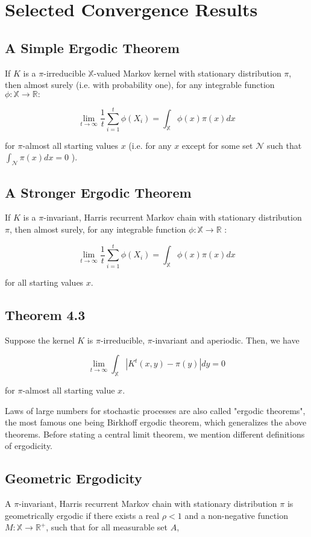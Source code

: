 \documentclass[10pt]{article}
\begin{document}
\section{Selected Convergence Results}
\subsection{A Simple Ergodic Theorem}
If $K$ is a $\pi$-irreducible $\mathbb{X}$-valued Markov kernel with stationary distribution $\pi$, then almost surely (i.e. with probability one), for any integrable function $\phi: \mathbb{X} \rightarrow \mathbb{R}:$

$$
\lim _{t \rightarrow \infty} \frac{1}{t} \sum_{i=1}^{t} \phi\left(X_{i}\right)=\int_{\mathbb{X}} \phi(x) \pi(x) d x
$$

for $\pi$-almost all starting values $x$ (i.e. for any $x$ except for some set $\mathcal{N}$ such that $\int_{\mathcal{N}} \pi(x) d x=0$ ).

\subsection{A Stronger Ergodic Theorem}
If $K$ is a $\pi$-invariant, Harris recurrent Markov chain with stationary distribution $\pi$, then almost surely, for any integrable function $\phi: \mathbb{X} \rightarrow \mathbb{R}$ :

$$
\lim _{t \rightarrow \infty} \frac{1}{t} \sum_{i=1}^{t} \phi\left(X_{i}\right)=\int_{\mathbb{X}} \phi(x) \pi(x) d x
$$

for all starting values $x$.

\subsection{Theorem 4.3}
 Suppose the kernel $K$ is $\pi$-irreducible, $\pi$-invariant and aperiodic. Then, we have

$$
\lim _{t \rightarrow \infty} \int_{\mathbb{X}}\left|K^{t}(x, y)-\pi(y)\right| d y=0
$$

for $\pi$-almost all starting value $x$.

Laws of large numbers for stochastic processes are also called "ergodic theorems", the most famous one being Birkhoff ergodic theorem, which generalizes the above theorems. Before stating a central limit theorem, we mention different definitions of ergodicity.

\subsection{Geometric Ergodicity}
A $\pi$-invariant, Harris recurrent Markov chain with stationary distribution $\pi$ is geometrically ergodic if there exists a real $\rho<1$ and a non-negative function $M: \mathbb{X} \rightarrow \mathbb{R}^{+}$, such that for all measurable set $A$,
\end{document}
